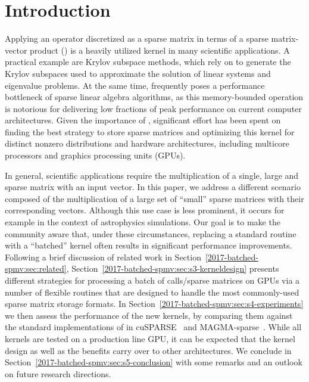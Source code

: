 \section{Introduction}
\label{2017-batched-spmv:sec:s1-intro}

Applying an operator discretized as a sparse matrix
in terms of a sparse matrix-vector product (\spmv)
is a heavily utilized kernel in many scientific applications.
A practical example are Krylov subspace methods, which rely on \spmv
to generate the Krylov subspaces used to approximate the solution
of linear systems and eigenvalue problems.
At the same time, \spmv frequently poses a performance bottleneck
of sparse linear algebra algorithms,
as this memory-bounded operation is notorious for delivering low fractions of peak performance on current computer architectures.
Given the importance of \spmv,
significant effort has been spent on finding the best strategy to store
sparse matrices and optimizing this kernel for
distinct nonzero distributions and hardware architectures,
including multicore processors and graphics processing units (GPUs).
 
In general, scientific applications require the multiplication of a single, large and sparse matrix with an input vector.
In this paper, we address a different scenario composed of
the multiplication of a large set of ``small'' sparse matrices with their corresponding vectors.
Although this use case is less prominent, it occurs for example in the context
of astrophysics simulations.
Our goal is to make the community aware that, under these circumstances,
replacing a standard routine with a ``batched'' \spmv kernel often results in significant
performance improvements. 
Following a brief discussion of related work in Section~\ref{2017-batched-spmv:sec:related},
Section~\ref{2017-batched-spmv:sec:s3-kerneldesign} 
presents different strategies for processing a batch of \spmv calls/sparse matrices on GPUs
via a number of flexible routines that are designed to handle the most commonly-used sparse matrix storage formats.
In Section~\ref{2017-batched-spmv:sec:s4-experiments} we then assess the performance of the new kernels, by comparing them against the standard 
implementations of \spmv in cuSPARSE~\cite{cuda8.0} 
and MAGMA-sparse~\cite{sellpreport}.  While all kernels are tested on a production line GPU, it can be expected
that the kernel design as well as the benefits carry over to other architectures.
We conclude in Section~\ref{2017-batched-spmv:sec:s5-conclusion} with some remarks and an outlook on future research directions. 

